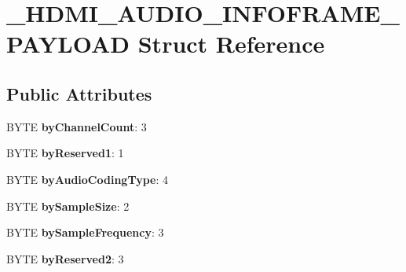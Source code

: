 \hypertarget{struct__HDMI__AUDIO__INFOFRAME__PAYLOAD}{\section{\-\_\-\-H\-D\-M\-I\-\_\-\-A\-U\-D\-I\-O\-\_\-\-I\-N\-F\-O\-F\-R\-A\-M\-E\-\_\-\-P\-A\-Y\-L\-O\-A\-D Struct Reference}
\label{struct__HDMI__AUDIO__INFOFRAME__PAYLOAD}
}
\subsection*{Public Attributes}
\begin{DoxyCompactItemize}
\item 
\hypertarget{struct__HDMI__AUDIO__INFOFRAME__PAYLOAD_a9954555819e1898788fa94b740a91883}{B\-Y\-T\-E {\bfseries by\-Channel\-Count}\-: 3}\label{struct__HDMI__AUDIO__INFOFRAME__PAYLOAD_a9954555819e1898788fa94b740a91883}

\item 
\hypertarget{struct__HDMI__AUDIO__INFOFRAME__PAYLOAD_ac577b6c1df0cf10cb466f018988b6f56}{B\-Y\-T\-E {\bfseries by\-Reserved1}\-: 1}\label{struct__HDMI__AUDIO__INFOFRAME__PAYLOAD_ac577b6c1df0cf10cb466f018988b6f56}

\item 
\hypertarget{struct__HDMI__AUDIO__INFOFRAME__PAYLOAD_a60e777a54f2d6514e7516c27ba8a72ae}{B\-Y\-T\-E {\bfseries by\-Audio\-Coding\-Type}\-: 4}\label{struct__HDMI__AUDIO__INFOFRAME__PAYLOAD_a60e777a54f2d6514e7516c27ba8a72ae}

\item 
\hypertarget{struct__HDMI__AUDIO__INFOFRAME__PAYLOAD_a5b617dc06793ac0d8af05b29b8bd4992}{B\-Y\-T\-E {\bfseries by\-Sample\-Size}\-: 2}\label{struct__HDMI__AUDIO__INFOFRAME__PAYLOAD_a5b617dc06793ac0d8af05b29b8bd4992}

\item 
\hypertarget{struct__HDMI__AUDIO__INFOFRAME__PAYLOAD_af34f6765a532c7c32985e007f553f2a8}{B\-Y\-T\-E {\bfseries by\-Sample\-Frequency}\-: 3}\label{struct__HDMI__AUDIO__INFOFRAME__PAYLOAD_af34f6765a532c7c32985e007f553f2a8}

\item 
\hypertarget{struct__HDMI__AUDIO__INFOFRAME__PAYLOAD_aa9840f99da2e63107ac3a24e3f394f69}{B\-Y\-T\-E {\bfseries by\-Reserved2}\-: 3}\label{struct__HDMI__AUDIO__INFOFRAME__PAYLOAD_aa9840f99da2e63107ac3a24e3f394f69}


\end{DoxyCompactItemize}

